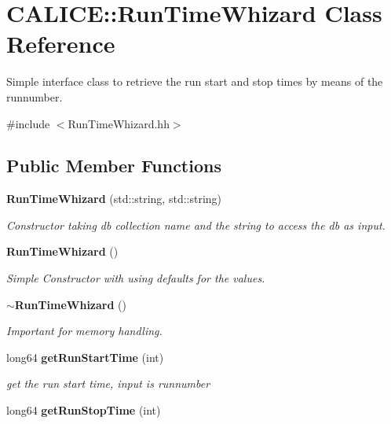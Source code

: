 \section{CALICE::RunTimeWhizard Class Reference}
\label{classCALICE_1_1RunTimeWhizard}


Simple interface class to retrieve the run start and stop times by means of the runnumber.  


{\ttfamily \#include $<$RunTimeWhizard.hh$>$}\subsection*{Public Member Functions}
\begin{DoxyCompactItemize}
\item 
{\bf RunTimeWhizard} (std::string, std::string)\label{classCALICE_1_1RunTimeWhizard_a9f6df1c3d32cb94179623c5f0ef37b10}

\begin{DoxyCompactList}\small\item\em Constructor taking db collection name and the string to access the db as input. \item\end{DoxyCompactList}\item 
{\bf RunTimeWhizard} ()\label{classCALICE_1_1RunTimeWhizard_ae510dd43ef03f8439200e9f43d00d4f2}

\begin{DoxyCompactList}\small\item\em Simple Constructor with using defaults for the values. \item\end{DoxyCompactList}\item 
{\bf $\sim$RunTimeWhizard} ()\label{classCALICE_1_1RunTimeWhizard_a10803722fc623d7788f6f62ed4d040b9}

\begin{DoxyCompactList}\small\item\em Important for memory handling. \item\end{DoxyCompactList}\item 
long64 {\bf getRunStartTime} (int)\label{classCALICE_1_1RunTimeWhizard_a5d5c407669853902aa6ded39232b8aad}

\begin{DoxyCompactList}\small\item\em get the run start time, input is runnumber \item\end{DoxyCompactList}\item 
long64 {\bf getRunStopTime} (int)\label{classCALICE_1_1RunTimeWhizard_a252ee65830f1acb99daea7cb2a1c9ec6}


\end{DoxyCompactItemize}
